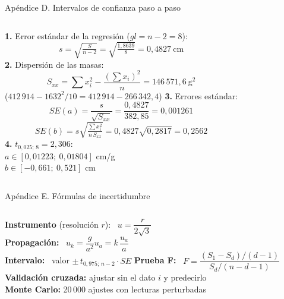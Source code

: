 \documentclass[aspectratio=169,11pt]{beamer}
\begin{document}
\begin{frame}{Apéndice D. Intervalos de confianza paso a paso}
  \small
  \begin{columns}[T]
    \textbf{1.} Error estándar de la regresión ($gl=n-2=8$):
    \[ s=\sqrt{\tfrac{S}{n-2}}=\sqrt{\tfrac{1{,}8639}{8}}=0{,}4827\ \text{cm} \]
    \textbf{2.} Dispersión de las masas:
    \[ S_{xx}=\textstyle\sum x_i^2-\frac{(\sum x_i)^2}{n}=146\,571{,}6\ \text{g}^2 \]
    {\footnotesize ($412\,914-1632^2/10=412\,914-266\,342{,}4$)}
    \textbf{3.} Errores estándar:
    \[ SE(a)=\frac{s}{\sqrt{S_{xx}}}=\frac{0{,}4827}{382{,}85}=0{,}001261 \]
    \[ SE(b)=s\sqrt{\tfrac{\sum x_i^2}{n\,S_{xx}}}=0{,}4827\sqrt{0{,}2817}=0{,}2562 \]
    \textbf{4.} $t_{0{,}025;\,8}=2{,}306$:\\[2pt]
    $a\in[0{,}01223;\ 0{,}01804]$ cm/g\\
    $b\in[-0{,}661;\ 0{,}521]$ cm
  \end{columns}
\end{frame}

\begin{frame}{Apéndice E. Fórmulas de incertidumbre}
  \small
  \begin{columns}[T]
    \textbf{Instrumento} (resolución $r$): \ $u=\dfrac{r}{2\sqrt3}$\\[6pt]
    \textbf{Propagación:} \ $u_k=\dfrac{g}{a^2}u_a=k\,\dfrac{u_a}{a}$\\[6pt]
    \textbf{Intervalo:} \ valor $\pm\,t_{0{,}975;\,n-2}\cdot SE$
    \textbf{Prueba F:} \ $F=\dfrac{(S_1-S_d)/(d-1)}{S_d/(n-d-1)}$\\[6pt]
    \textbf{Validación cruzada:} ajustar sin el dato $i$ y predecirlo\\[6pt]
    \textbf{Monte Carlo:} 20\,000 ajustes con lecturas perturbadas
  \end{columns}
\end{frame}
\end{document}
